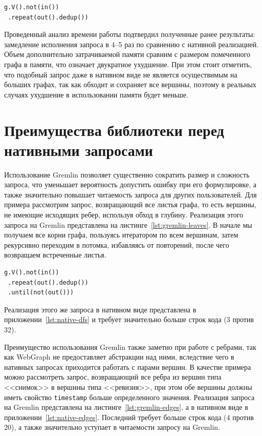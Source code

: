\documentclass[times,specification,annotation]{itmo-student-thesis}
\begin{document}
\begin{lstlisting}[float=!h,caption={Запрос, обходящий весь граф},label={lst:gremlin-dfs}]
g.V().not(in())
 .repeat(out().dedup())
\end{lstlisting}

Проведенный анализ времени работы подтвердил полученные ранее результаты: замедление исполнения запроса в 4--5 раз по сравнению с нативной реализацией. Объем дополнительно затрачиваемой памяти сравним с размером помеченного графа в памяти, что означает двукратное ухудшение. При этом стоит отметить, что подобный запрос даже в нативном виде не является осуществимым на больших графах, так как обходит и сохраняет все вершины, поэтому в реальных случаях ухудшение в использовании памяти будет меньше.

\section{Преимущества библиотеки перед нативными запросами}

Использование Gremlin позволяет существенно сократить размер и сложность запроса, что уменьшает вероятность допустить ошибку при его формулировке, а также значительно повышает читаемость запроса для других пользователей. Для примера рассмотрим запрос, возвращающий все листья графа, то есть вершины, не имеющие исходящих ребер, используя обход в глубину. Реализация этого запроса на Gremlin представлена на листинге~\ref{lst:gremlin-leaves}. В начале мы получаем все корни графа, пользуясь итератором по всем вершинам, затем рекурсивно переходим в потомка, избавляясь от повторений, после чего возвращаем встреченные листья.

\begin{lstlisting}[float=!h,caption={Получение листьев графа на Gremlin},label={lst:gremlin-leaves}]
g.V().not(in())
 .repeat(out().dedup())
 .until(not(out()))
\end{lstlisting}

Реализация этого же запроса в нативном виде представлена в приложении~\ref{lst:native-dfs} и требует значительно больше строк кода (3 против 32).

Преимущество использования Gremlin также заметно при работе с ребрами, так как WebGraph не предоставляет абстракции над ними, вследствие чего в нативных запросах приходится работать с парами вершин. В качестве примера можно рассмотреть запрос, возвращающий все ребра из вершин типа <<снимок>> в вершины типа <<ревизия>>, при этом обе вершины должны иметь свойство \texttt{timestamp} больше определенного значения. Реализация запроса на Gremlin представлена на листинге~\ref{lst:gremlin-edges}, а в нативном виде в приложении~\ref{lst:native-edges}. Последний требует больше строк кода (4 против 20), а также значительно уступает в читаемости запросу на Gremlin.
\end{document}
